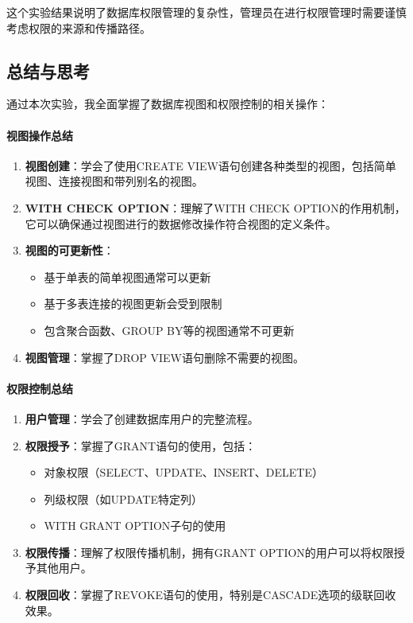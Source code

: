 \documentclass[a4paper]{article}
\begin{document}
这个实验结果说明了数据库权限管理的复杂性，管理员在进行权限管理时需要谨慎考虑权限的来源和传播路径。

\subsection{总结与思考}

通过本次实验，我全面掌握了数据库视图和权限控制的相关操作：

\paragraph{视图操作总结}
\begin{enumerate}
    \item \textbf{视图创建}：学会了使用CREATE VIEW语句创建各种类型的视图，包括简单视图、连接视图和带列别名的视图。
    \item \textbf{WITH CHECK OPTION}：理解了WITH CHECK OPTION的作用机制，它可以确保通过视图进行的数据修改操作符合视图的定义条件。
    \item \textbf{视图的可更新性}：
       \begin{itemize}
           \item 基于单表的简单视图通常可以更新
           \item 基于多表连接的视图更新会受到限制
           \item 包含聚合函数、GROUP BY等的视图通常不可更新
       \end{itemize}
    \item \textbf{视图管理}：掌握了DROP VIEW语句删除不需要的视图。
\end{enumerate}

\paragraph{权限控制总结}
\begin{enumerate}
    \item \textbf{用户管理}：学会了创建数据库用户的完整流程。
    \item \textbf{权限授予}：掌握了GRANT语句的使用，包括：
       \begin{itemize}
           \item 对象权限（SELECT、UPDATE、INSERT、DELETE）
           \item 列级权限（如UPDATE特定列）
           \item WITH GRANT OPTION子句的使用
       \end{itemize}
    \item \textbf{权限传播}：理解了权限传播机制，拥有GRANT OPTION的用户可以将权限授予其他用户。
    \item \textbf{权限回收}：掌握了REVOKE语句的使用，特别是CASCADE选项的级联回收效果。
\end{enumerate}
\end{document}
